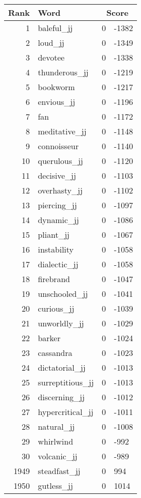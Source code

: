 \begin{longtable}[!htbp]{| rlr@{.}l |}
    \hline
    \textbf{Rank} & \textbf{Word} & \multicolumn{2}{c|}{\textbf{Score}} \\
    \hline
    \endhead
    1 & baleful\_jj & 0 & -1382 \\
    2 & loud\_jj & 0 & -1349 \\
    3 & devotee & 0 & -1338 \\
    4 & thunderous\_jj & 0 & -1219 \\
    5 & bookworm & 0 & -1217 \\
    6 & envious\_jj & 0 & -1196 \\
    7 & fan & 0 & -1172 \\
    8 & meditative\_jj & 0 & -1148 \\
    9 & connoisseur & 0 & -1140 \\
    10 & querulous\_jj & 0 & -1120 \\
    11 & decisive\_jj & 0 & -1103 \\
    12 & overhasty\_jj & 0 & -1102 \\
    13 & piercing\_jj & 0 & -1097 \\
    14 & dynamic\_jj & 0 & -1086 \\
    15 & pliant\_jj & 0 & -1067 \\
    16 & instability & 0 & -1058 \\
    17 & dialectic\_jj & 0 & -1058 \\
    18 & firebrand & 0 & -1047 \\
    19 & unschooled\_jj & 0 & -1041 \\
    20 & curious\_jj & 0 & -1039 \\
    21 & unworldly\_jj & 0 & -1029 \\
    22 & barker & 0 & -1024 \\
    23 & cassandra & 0 & -1023 \\
    24 & dictatorial\_jj & 0 & -1013 \\
    25 & surreptitious\_jj & 0 & -1013 \\
    26 & discerning\_jj & 0 & -1012 \\
    27 & hypercritical\_jj & 0 & -1011 \\
    28 & natural\_jj & 0 & -1008 \\
    29 & whirlwind & 0 & -992 \\
    30 & volcanic\_jj & 0 & -989 \\
    1949 & steadfast\_jj & 0 & 994 \\
    1950 & gutless\_jj & 0 & 1014 \\

\end{longtable}
